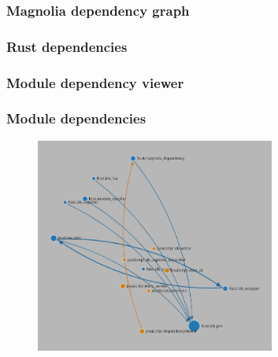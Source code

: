 \begin{frame}
  \frametitle{Magnolia dependency graph}
\end{frame}

\begin{frame}
  \frametitle{Rust dependencies}
\end{frame}


\begin{frame}
  \frametitle{Module dependency viewer}
\end{frame}

\begin{frame}
  \frametitle{Module dependencies}
  \begin{figure}
    \centering
      \includegraphics[width=0.7\textwidth]{./pics/module-dependencies.png}
  \end{figure}
\end{frame}

